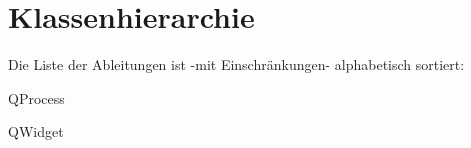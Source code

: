 \section{Klassenhierarchie}
Die Liste der Ableitungen ist -\/mit Einschränkungen-\/ alphabetisch sortiert\+:\begin{DoxyCompactList}
\item Q\+Process\begin{DoxyCompactList}
\item {}
\end{DoxyCompactList}
\item Q\+Widget\begin{DoxyCompactList}
\item {}
\item {}
\item {}
\item {}
\item {}
\end{DoxyCompactList}
\end{DoxyCompactList}
